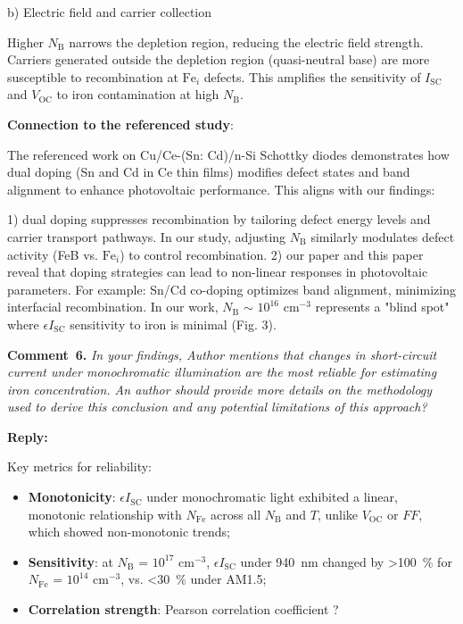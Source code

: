 \documentclass[a4paper,fleqn]{cas-sc}
\begin{document}
b) Electric field and carrier collection

Higher $N_\mathrm{B}$ narrows the depletion region, reducing the electric field strength. Carriers generated outside the depletion region (quasi-neutral base) are more susceptible to recombination at $\mathrm{Fe}_i$ defects. This amplifies the sensitivity of $I_\mathrm{SC}$ and $V_\mathrm{OC}$ to iron contamination at high $N_\mathrm{B}$.

\textbf{Connection to the referenced study}:

The referenced work on Cu/Ce-(Sn: Cd)/n-Si Schottky diodes demonstrates how dual doping (Sn and Cd in Ce thin films) modifies defect states and band alignment to enhance photovoltaic performance. This aligns with our findings:

1) dual doping suppresses recombination by tailoring defect energy levels and carrier transport pathways. In our study, adjusting $N_\mathrm{B}$ similarly modulates defect activity (FeB vs. $\mathrm{Fe}_i$) to control recombination.
2) our paper and this paper reveal that doping strategies can lead to non-linear responses in photovoltaic parameters. For example: Sn/Cd co-doping optimizes band alignment, minimizing interfacial recombination. In our work,  $N_\mathrm{B}$ $\sim$ $10^{16}$ cm$^{-3}$ represents a "blind spot" where $\epsilon I_\mathrm{SC}$ sensitivity to iron is minimal (Fig. 3).

\vspace{1cm}
\noindent
\textcolor[rgb]{0.00,0.50,1.00}{\textbf{Comment~6.}}
\emph{In your findings, Author mentions that changes in short-circuit current under monochromatic illumination are the most reliable for estimating iron concentration. An author should provide more details on the methodology used to derive this conclusion and any potential limitations of this approach?}

\noindent
\textcolor[rgb]{0.51,0.00,0.00}{\textbf{Reply:}}

Key metrics for reliability:

\begin{itemize}
    \item \textbf{Monotonicity}: $\epsilon I_\mathrm{SC}$ under monochromatic light exhibited a linear, monotonic relationship with $N_\mathrm{Fe}$ across all $N_\mathrm{B}$ and $T$, unlike $V_\mathrm{OC}$ or $FF$, which showed non-monotonic trends;
    \item \textbf{Sensitivity}: at $N_\mathrm{B}$ = $10^{17}$ cm$^{-3}$, $\epsilon I_\mathrm{SC}$ under 940~nm changed by >100~\% for $N_\mathrm{Fe}$ = $10^{14}$ cm$^{-3}$, vs. <30~\% under AM1.5;
    \item \textbf{Correlation strength}: Pearson correlation coefficient ?
\end{itemize}
 
\end{document}
